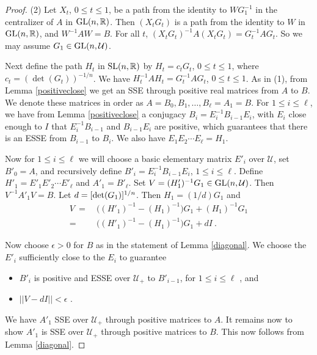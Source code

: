 \documentclass{amsart}
\theoremstyle{definition}
\theoremstyle{remark}
\newcommand{\ri}{\mathcal U}
\numberwithin{equation}{section}
\begin{document}
{{\begin{proof}
(2) 
Let $X_t$, $0\leq t \leq 1$, be a path from the identity to $WG_1^{-1}$ 
in the centralizer of $A$ in 
$\textnormal{GL}(n, \mathbb R)$. Then $(X_tG_t)$ is a path from the identity 
to $W$ in $\textnormal{GL}(n, \mathbb R)$, and $W^{-1}AW=B$. 
For all $t$, $(X_tG_t)^{-1}A(X_tG_t)=G_t^{-1}AG_t $. 
So we may assume $G_1 
\in \textnormal{GL}(n, \mathcal U)$. 

Next define the path $H_t$ in $\textnormal{SL}(n,\mathbb R)$ by 
$H_t= c_tG_t$, $0\leq t\leq 1$, where $c_t=(\det (G_t))^{-1/n}$. 
We have  $H_t^{-1}AH_t=G_t^{-1}AG_t$, $0\leq t \leq 1$.  
As in (1), from 
Lemma \ref{positiveclose} we get an SSE through  
 positive real matrices from $A$ to $B$. We denote these  
matrices in order as   $A=B_0, B_1, \dots  , B_{\ell} =A_1=B$. 
For $1\leq i \leq \ell$, we have from 
Lemma \ref{positiveclose} a conjugacy 
$B_i = E_i^{-1}B_{i-1}E_i$, with $E_i$ close enough to $I$ 
that $ E_i^{-1}B_{i-1}$ and 
$B_{i-1}E_i$ are positive, which guarantees that there is 
an ESSE from $B_{i-1} $ to $B_i$. 
We also have $E_1E_2\cdots E_{\ell}=H_1$. 

Now for $1\leq i \leq \ell$ we will  choose a 
basic elementary matrix $E'_i$ over $\ri$, set 
$B'_0=A$, and recursively 
define $B'_i = 
E_i^{-1}B_{i-1}E_i$, $1\leq i \leq \ell$. 
Define $H'_1 = E'_1E'_2\cdots E'_{\ell}$ and 
$A'_1= B'_{\ell}$.  
Set $V=(H'_1)^{-1}G_1\in\textnormal{GL}(n,\mathcal U)$. 
Then $V^{-1}A'_1V=B$. Let $d=[\textnormal{det}(G_1)]^{1/n}$. 
Then $H_1=(1/d)G_1$ and 
\begin{align*} 
V\ =\ & \Big((H'_1)^{-1}-(H_1)^{-1}\Big)G_1 + (H_1)^{-1}G_1 \\ 
=\ & \Big((H'_1)^{-1}-(H_1)^{-1}\Big)G_1 +dI \ . 
\end{align*} 

Now choose $\epsilon >0$ for $B$ as in the statement of 
Lemma \ref{diagonal}. 
We 
 choose the $E'_i$ sufficiently close to the $E_i$  
to guarantee 
\begin{itemize} 
\item 
$B'_i$ is positive and ESSE over $\mathcal U_+$ 
to $B'_{i-1}$, for $1\leq i \leq \ell$ , and  
\item 
$||V-dI||<\epsilon$ .  
\end{itemize}
We have $A'_1$ SSE over $\mathcal U_+$ through 
positive matrices to $A$. It remains now to 
show  
$A'_1$ is SSE over $\mathcal U_+$ through 
positive matrices to $B$. This now follows 
from Lemma \ref{diagonal}. 




\end{proof}}}
\end{document}
